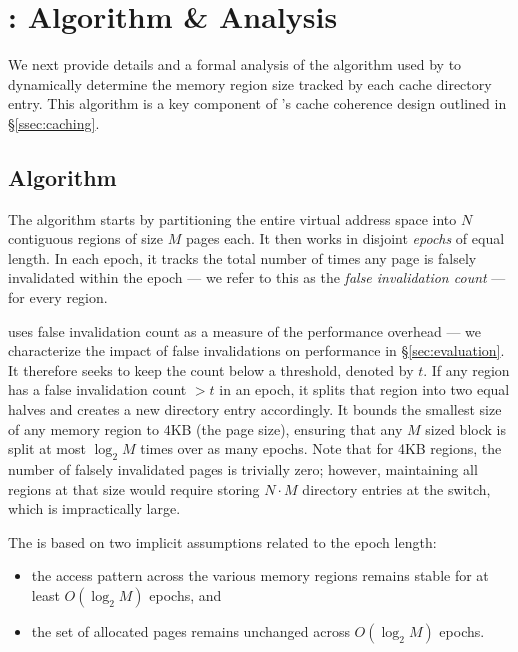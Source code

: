 
\section{\Algo: Algorithm \& Analysis}
\label{sec:algorithm}

We next provide details and a formal analysis of the \algo algorithm used by \mind to dynamically determine the memory region size tracked by each cache directory entry.  This algorithm is a key component of \mind's cache coherence design outlined in \S\ref{ssec:caching}.

\subsection{Algorithm}
\label{ssec:detail}

The \algo algorithm starts by partitioning the entire virtual address space into $N$ contiguous regions of size $M$ pages each. It then works in disjoint \emph{epochs} of equal length. In each epoch, it tracks the total number of times any page is falsely invalidated within the epoch  --- we refer to this as the \textit{false invalidation count} --- for every region.

\Algo uses false invalidation count as a measure of the performance overhead --- we characterize the impact of false invalidations on performance in \S\ref{sec:evaluation}. It therefore seeks to keep the count below a threshold, denoted by $t$. 
If any region has a false invalidation count $> t$ in an epoch, it splits that region into two equal halves and creates a new directory entry accordingly. It bounds the smallest size of any memory region to $4$KB (the page size), ensuring that any $M$ sized block is split at most $\log_2{M}$ times over as many epochs. Note that for 4KB regions, the number of falsely invalidated pages is trivially zero; however, maintaining all regions at that size would require storing $N\cdot M$ directory entries at the switch, which is impractically large. 


 The \algo is based on two implicit assumptions related to the epoch length:
\begin{itemize}[itemsep=0pt, leftmargin=*]
  \item the access pattern across the various memory regions remains stable for at least $O(\log_2{M})$ epochs, and
  \item the set of allocated pages remains unchanged across $O(\log_2{M})$ epochs.
\end{itemize}

